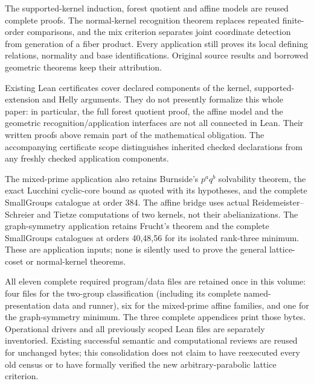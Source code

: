 The supported-kernel induction, forest quotient and affine models are
reused complete proofs. The normal-kernel recognition theorem replaces
repeated finite-order comparisons, and the mix criterion separates joint
coordinate detection from generation of a fiber product. Every application
still proves its local defining relations, normality and base identifications.
Original source results and borrowed geometric theorems keep their attribution.

Existing Lean certificates cover declared components of the kernel,
supported-extension and Helly arguments. They do not presently formalize
this whole paper: in particular, the full forest quotient proof, the
affine model and the geometric recognition/application interfaces are
not all connected in Lean. Their written proofs above remain part of the
mathematical obligation. The accompanying certificate scope
distinguishes inherited checked declarations from any freshly checked
application components.


The mixed-prime application also retains Burnside's $p^a q^b$ solvability
theorem, the exact Lucchini cyclic-core bound as quoted with its hypotheses,
and the complete SmallGroups catalogue at order 384. The affine bridge
uses actual Reidemeister--Schreier and Tietze computations of two kernels,
not their abelianizations. The graph-symmetry application retains Frucht's
theorem and the complete SmallGroups catalogues at orders 40,48,56 for its
isolated rank-three minimum. These are application inputs; none is silently
used to prove the general lattice-coset or normal-kernel theorems.

All eleven complete required program/data files are retained once in this
volume: four files for the two-group classification (including its complete
named-presentation data and runner), six for the mixed-prime affine families,
and one for the graph-symmetry minimum. The three complete appendices print
those bytes. Operational drivers and all previously scoped Lean files are
separately inventoried. Existing successful semantic and computational
reviews are reused for unchanged bytes; this consolidation does not claim
to have reexecuted every old census or to have formally verified the new
arbitrary-parabolic lattice criterion.
